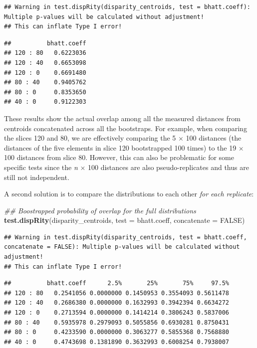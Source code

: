 \documentclass[]{book}
\newenvironment{Shaded}{\begin{snugshade}}{\end{snugshade}}
\newcommand{\CommentTok}[1]{\textcolor[rgb]{0.56,0.35,0.01}{\textit{#1}}}
\newcommand{\DataTypeTok}[1]{\textcolor[rgb]{0.13,0.29,0.53}{#1}}
\newcommand{\KeywordTok}[1]{\textcolor[rgb]{0.13,0.29,0.53}{\textbf{#1}}}
\newcommand{\NormalTok}[1]{#1}
\newcommand{\OtherTok}[1]{\textcolor[rgb]{0.56,0.35,0.01}{#1}}
\begin{document}
\begin{verbatim}
## Warning in test.dispRity(disparity_centroids, test = bhatt.coeff): Multiple p-values will be calculated without adjustment!
## This can inflate Type I error!
\end{verbatim}

\begin{verbatim}
##          bhatt.coeff
## 120 : 80   0.6223036
## 120 : 40   0.6653098
## 120 : 0    0.6691480
## 80 : 40    0.9405762
## 80 : 0     0.8353650
## 40 : 0     0.9122303
\end{verbatim}

These results show the actual overlap among all the measured distances from centroids concatenated across all the bootstraps.
For example, when comparing the slices 120 and 80, we are effectively comparing the 5 \(\times\) 100 distances (the distances of the five elements in slice 120 bootstrapped 100 times) to the 19 \(\times\) 100 distances from slice 80.
However, this can also be problematic for some specific tests since the \emph{n} \(\times\) 100 distances are also pseudo-replicates and thus are still not independent.

A second solution is to compare the distributions to each other \emph{for each replicate}:

\begin{Shaded}
\begin{Highlighting}[]
\CommentTok{## Boostrapped probability of overlap for the full distributions}
\KeywordTok{test.dispRity}\NormalTok{(disparity_centroids, }\DataTypeTok{test =}\NormalTok{ bhatt.coeff,}
              \DataTypeTok{concatenate =} \OtherTok{FALSE}\NormalTok{)}
\end{Highlighting}
\end{Shaded}

\begin{verbatim}
## Warning in test.dispRity(disparity_centroids, test = bhatt.coeff, concatenate = FALSE): Multiple p-values will be calculated without adjustment!
## This can inflate Type I error!
\end{verbatim}

\begin{verbatim}
##          bhatt.coeff      2.5%       25%       75%     97.5%
## 120 : 80   0.2541056 0.0000000 0.1450953 0.3554093 0.5611478
## 120 : 40   0.2686380 0.0000000 0.1632993 0.3942394 0.6634272
## 120 : 0    0.2713594 0.0000000 0.1414214 0.3806243 0.5837006
## 80 : 40    0.5935978 0.2979093 0.5055856 0.6930281 0.8750431
## 80 : 0     0.4233590 0.0000000 0.3063277 0.5855368 0.7568880
## 40 : 0     0.4743698 0.1381890 0.3632993 0.6008254 0.7938007
\end{verbatim}
\end{document}
